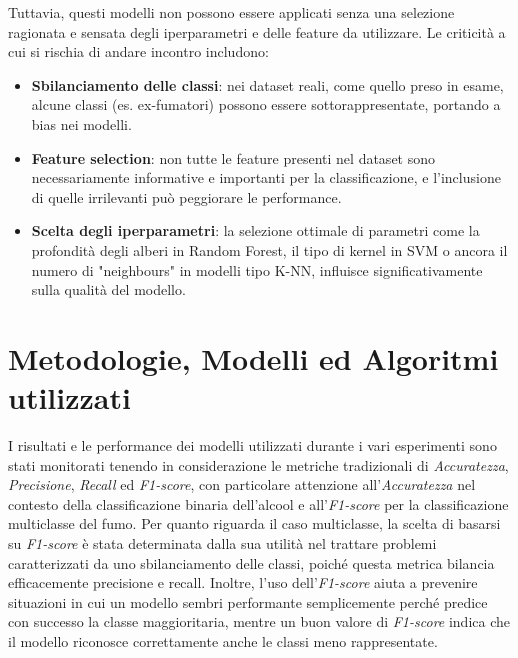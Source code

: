 \documentclass{article}
\begin{document}
\begin{multicols}{2}
Tuttavia, questi modelli non possono essere applicati senza una selezione ragionata e sensata degli iperparametri e delle feature da utilizzare. Le criticità a cui si rischia di andare incontro includono:

\begin{itemize}[leftmargin=*]
    \item \textbf{Sbilanciamento delle classi}: nei dataset reali, come quello preso in esame, alcune classi (es. ex-fumatori) possono essere sottorappresentate, portando a bias nei modelli.
    \item \textbf{Feature selection}: non tutte le feature presenti nel dataset sono necessariamente informative e importanti per la classificazione, e l'inclusione di quelle irrilevanti può peggiorare le performance.
    \item \textbf{Scelta degli iperparametri}: la selezione ottimale di parametri come la profondità degli alberi in Random Forest, il tipo di kernel in SVM o ancora il numero di "neighbours" in modelli tipo K-NN, influisce significativamente sulla qualità del modello.
\end{itemize}

\section{Metodologie, Modelli ed Algoritmi utilizzati}

I risultati e le performance dei modelli utilizzati durante i vari esperimenti sono stati monitorati tenendo in considerazione le metriche tradizionali di \textit{Accuratezza}, \textit{Precisione}, \textit{Recall} ed \textit{F1-score}, con particolare attenzione all'\textit{Accuratezza} nel contesto della classificazione binaria dell'alcool e all'\textit{F1-score} per la classificazione multiclasse del fumo. 
Per quanto riguarda il caso multiclasse, la scelta di basarsi su \textit{F1-score} è stata determinata dalla sua utilità nel trattare problemi caratterizzati da uno sbilanciamento delle classi, poiché questa metrica bilancia efficacemente precisione e recall.
Inoltre, l'uso dell'\textit{F1-score} aiuta a prevenire situazioni in cui un modello sembri performante semplicemente perché predice con successo la classe maggioritaria, mentre un buon valore di \textit{F1-score} indica che il modello riconosce correttamente anche le classi meno rappresentate. 


\end{multicols}
\end{document}
